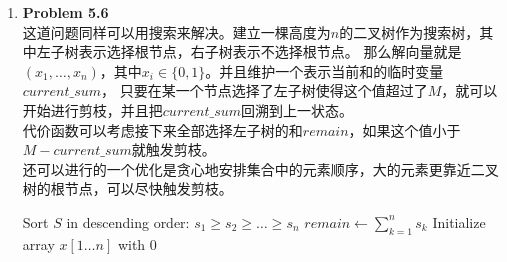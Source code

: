 \documentclass{ctexart}
\begin{document}
\begin{enumerate}[label=\arabic*.]
\begin{algorithm}[H]
{{{                        
                    }
                }
            }
            \;
        \end{algorithm}
        算法的时间复杂度会达到$O(n^n)$。
    \item \textbf{Problem 5.6}\\
        这道问题同样可以用搜索来解决。建立一棵高度为$n$的二叉树作为搜索树，其中左子树表示选择根节点，右子树表示不选择根节点。
        那么解向量就是$(x_1,\dots,x_n)$，其中$x_i\in\{0,1\}$。并且维护一个表示当前和的临时变量$current\_sum$，
        只要在某一个节点选择了左子树使得这个值超过了$M$，就可以开始进行剪枝，并且把$current\_sum$回溯到上一状态。\\
        代价函数可以考虑接下来全部选择左子树的和$remain$，如果这个值小于$M-current\_sum$就触发剪枝。\\
        还可以进行的一个优化是贪心地安排集合中的元素顺序，大的元素更靠近二叉树的根节点，可以尽快触发剪枝。\\
        \begin{algorithm}[H]
            \caption{子集和问题的回溯搜索算法（双重剪枝优化）}
            
            Sort $S$ in descending order: $s_1 \ge s_2 \ge \dots \ge s_n$\;
            $remain \leftarrow \sum_{k=1}^n s_k$ 
            Initialize array $x[1\dots n]$ with $0$\;
            

\end{algorithm}
\end{enumerate}
\end{document}
